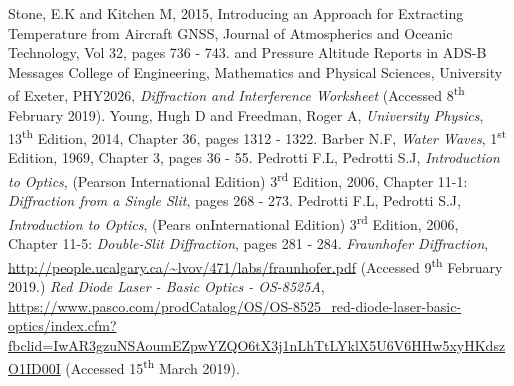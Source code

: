 \documentclass{article}
\begin{document}
\begin{thebibliography}{9}
 Stone, E.K and Kitchen M, 2015, Introducing an Approach for Extracting Temperature from Aircraft GNSS, Journal of Atmospherics and Oceanic Technology, Vol 32, pages 736 - 743. 
and Pressure Altitude Reports in ADS-B Messages
 College of Engineering, Mathematics and Physical Sciences, University of Exeter, PHY2026, \textit{Diffraction and Interference Worksheet} (Accessed 8\textsuperscript{th} February 2019).
 Young, Hugh D and Freedman, Roger A, \textit{University Physics}, 13\textsuperscript{th} Edition, 2014, Chapter 36, pages 1312 - 1322.
 Barber N.F, \textit{Water Waves}, 1\textsuperscript{st} Edition, 1969, Chapter 3, pages 36 - 55. 
 Pedrotti F.L, Pedrotti S.J, \textit{Introduction to Optics}, (Pearson International Edition) 3\textsuperscript{rd} Edition, 2006, Chapter 11-1: \textit{Diffraction from a Single Slit}, pages 268 - 273.
 Pedrotti F.L, Pedrotti S.J, \textit{Introduction to Optics},  (Pears onInternational Edition) 3\textsuperscript{rd} Edition, 2006, Chapter 11-5: \textit{Double-Slit Diffraction}, pages 281 - 284.
 \textit{Fraunhofer Diffraction}, \url{http://people.ucalgary.ca/~lvov/471/labs/fraunhofer.pdf} (Accessed 9\textsuperscript{th} February 2019.)
 \textit{Red Diode Laser - Basic Optics - OS-8525A}, 
\url{https://www.pasco.com/prodCatalog/OS/OS-8525_red-diode-laser-basic-optics/index.cfm?fbclid=IwAR3gzuNSAoumEZpwYZQO6tX3j1nLhTtLYklX5U6V6HHw5xyHKdszO1ID00I} (Accessed 15\textsuperscript{th} March 2019).

\end{thebibliography}
\end{document}
